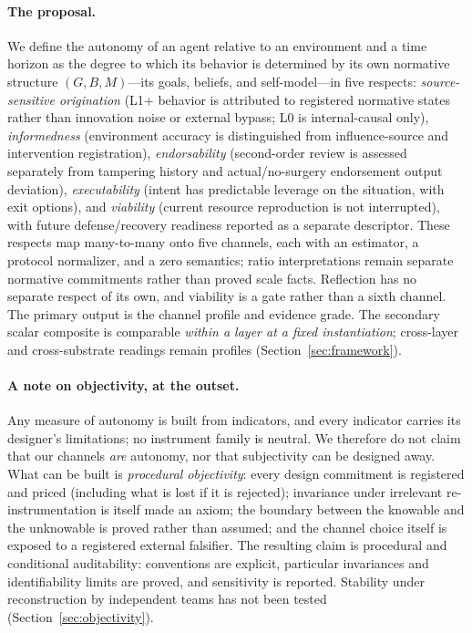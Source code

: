 \paragraph{The proposal.} We define the autonomy of an agent relative to an
environment and a time horizon as the degree to which its behavior is
determined by its own normative structure $(G,B,M)$---its goals, beliefs, and
self-model---in five respects: \emph{source-sensitive origination} (L1+ behavior is
attributed to registered normative states rather than innovation noise or
external bypass; L0 is internal-causal only), \emph{informedness}
(environment accuracy is distinguished from influence-source and intervention
registration), \emph{endorsability} (second-order review is assessed separately
from tampering history and actual/no-surgery endorsement output deviation),
\emph{executability} (intent
has predictable leverage on the situation, with exit options), and
\emph{viability} (current resource reproduction is not interrupted), with
future defense/recovery readiness reported as a separate descriptor. These respects map many-to-many onto five channels, each with
an estimator, a protocol normalizer, and a zero semantics; ratio
interpretations remain separate normative commitments rather than proved scale
facts. Reflection has
no separate respect of its own, and viability is a gate rather than a sixth
channel. The primary output is the channel profile and evidence grade. The
secondary scalar composite is comparable \emph{within a layer at a fixed
instantiation}; cross-layer and cross-substrate readings remain profiles
(Section~\ref{sec:framework}).

\paragraph{A note on objectivity, at the outset.} Any measure of autonomy is
built from indicators, and every indicator carries its designer's limitations;
no instrument family is neutral. We therefore do not claim that our channels
\emph{are} autonomy, nor that subjectivity can be designed away. What can be
built is \emph{procedural objectivity}: every design commitment is registered
and priced (including what is lost if it is rejected); invariance under
irrelevant re-instrumentation is itself made an axiom; the boundary between
the knowable and the unknowable is proved rather than assumed; and the
channel choice itself is exposed to a registered external falsifier. The
resulting claim is procedural and conditional auditability: conventions are
explicit, particular invariances and identifiability limits are proved, and
sensitivity is reported. Stability under reconstruction by independent teams
has not been tested (Section~\ref{sec:objectivity}).

